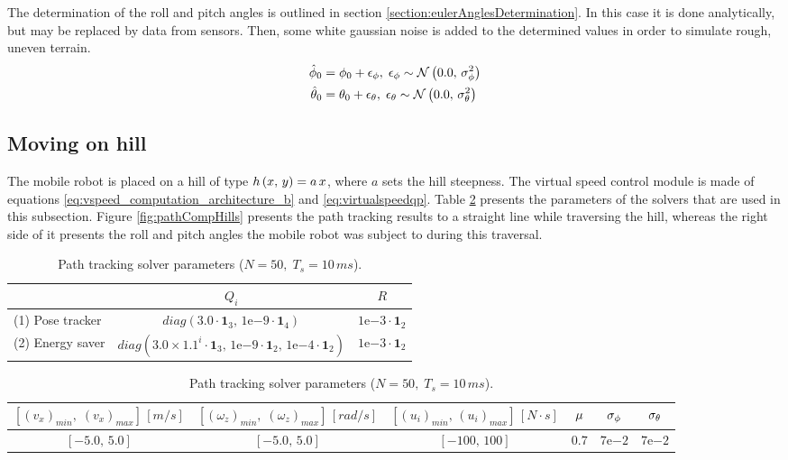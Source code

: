 The determination of the roll and pitch angles is outlined in section \ref{section:eulerAnglesDetermination}. In this case it is done analytically, but may be replaced by data from sensors. Then, some white gaussian noise is added to the determined values in order to simulate rough, uneven terrain.
\begin{subequations}
	\begin{align}
		\hat{\phi}_0 &= \phi_0 + \epsilon_{\phi}, \; \epsilon_{\phi} \sim \mathcal{N}\left(0.0,\,\sigma_{\phi}^2\right)\\
		\hat{\theta}_0 &= \theta_0 + \epsilon_{\theta}, \; \epsilon_{\theta} \sim \mathcal{N}\left(0.0,\,\sigma_{\theta}^2\right)
	\end{align}
\end{subequations}
\subsection{Moving on hill}
\label{subsection:hill}

The mobile robot is placed on a hill of type $h\left(x,\,y\right) = a\,x$, where $a$ sets the hill steepness. The virtual speed control module is made of equations \eqref{eq:vspeed_computation_architecture_b} and \eqref{eq:virtualspeedqp}. Table \ref{tab:hillPathTrackingSpecs} presents the parameters of the solvers that are used in this subsection. Figure \ref{fig:pathCompHills} presents the path tracking results to a straight line while traversing the hill, whereas the right side of it presents the roll and pitch angles the mobile robot was subject to during this traversal.

\begin{table}[!htb]
  \caption[Solver parameters on hill.]{Path tracking solver parameters ($N = 50,\; T_s = 10\,ms$).}
  \label{tab:hillPathTrackingSpecs}
  \renewcommand{\arraystretch}{1.1}
  \centering
  \begin{tabular}[]{lcc}
	\toprule
		& $Q_i$ & $R$\\
	\midrule
	(1) Pose tracker & $diag\left(3.0 \cdot \mathbf{1}_3,\,1\mathrm{e}{-9} \cdot \mathbf{1}_4\right)$ & $1\mathrm{e}{-3}\cdot \mathbf{1}_2$\\
	(2) Energy saver & $diag\left(3.0\times 1.1^i \cdot \mathbf{1}_3,\,1\mathrm{e}{-9} \cdot \mathbf{1}_2,\,1\mathrm{e}{-4}\cdot\mathbf{1}_2\right)$ & $1\mathrm{e}{-3}\cdot \mathbf{1}_2$\\
	\end{tabular}
	\begin{tabular}[]{cccccc}
  	\toprule
  	$\left[(v_x)_{min},\; (v_x)_{max}\right]\,[m/s]$ & $\left[(\omega_z)_{min},\; (\omega_z)_{max}\right]\,[rad/s]$ & $\left[(u_i)_{min},\,(u_i)_{max}\right]\,[N \cdot s]$ & $\mu$ & $\sigma_{\phi}$ & $\sigma_{\theta}$\\
  	\midrule
  	$\left[-5.0,\,5.0\right]$ & $\left[-5.0,\,5.0\right]$ & $\left[-100,\,100\right]$ & $0.7$ & $7\mathrm{e}{-2}$ & $7\mathrm{e}{-2}$\\
  	\bottomrule
  \end{tabular}
\end{table}

